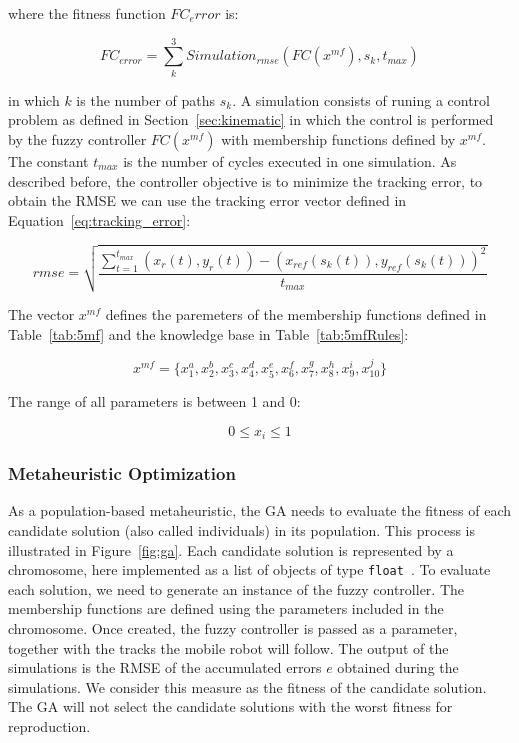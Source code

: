 \documentclass[symmetry,article,submit,moreauthors,pdftex]{Definitions/mdpi}
\begin{document}
where the fitness function $FC_error$ is:

\begin{equation}
  FC_{error} = \sum_{k}^3 Simulation_{rmse}(FC(x^{mf}), s_k, t_{max}) 
\end{equation}

in which $k$ is the number of paths $s_k$. A simulation consists of runing a control problem as 
defined in Section~\ref{sec:kinematic} in which the control is
performed by the fuzzy controller $FC(x^{mf})$ with membership functions
defined by $x^{mf}$. The constant $t_{max}$ is the number of cycles executed in one simulation.
As described before, the controller objective is to minimize the tracking error, 
to obtain the RMSE we can use the tracking error vector defined in Equation~\ref{eq:tracking_error}:

\begin{equation}\label{eq:tracking_error}
 rmse = \sqrt{\frac{\sum_{t=1}^{t_{max}} (x_r(t),y_r(t))-(x_{ref}(s_k(t)),y_{ref}(s_k(t)))^2}{t_{max}}}
\end{equation}

The vector $x^{mf}$ defines the paremeters of the membership functions defined in Table~\ref{tab:5mf} 
and the knowledge base in Table~\ref{tab:5mfRules}: 

\begin{equation}\label{eq:mfs}
 x^{mf} = \{x_1^a, x_2^b, x_3^c, x_4^d, x_5^e, x_6^f, x_7^g, x_8^h, x_9^i, x_{10}^j\}
\end{equation}

The range of all parameters is between 1 and 0: 

\begin{equation}\label{eq:mfs}
  0 \leq x_i \leq 1
\end{equation}


\subsubsection{Metaheuristic Optimization}\label{sec:GAO}



As a population-based metaheuristic, the GA needs to evaluate the fitness of
each candidate solution (also called individuals) in its population. This
process is illustrated in Figure~\ref{fig:ga}. Each candidate solution is
represented by a chromosome, here implemented as a list of objects of type {
\tt float }. To evaluate each solution, we need to generate an instance of the
fuzzy controller. The membership functions are defined using the parameters
included in the chromosome. Once created, the fuzzy controller is passed as a
parameter, together with the tracks the mobile robot will follow. The output of
the simulations is the RMSE of the accumulated errors $e$  obtained during the
simulations. We consider this measure as the fitness of the candidate solution.
The GA will not select the candidate solutions with the worst fitness for
reproduction.
\end{document}
